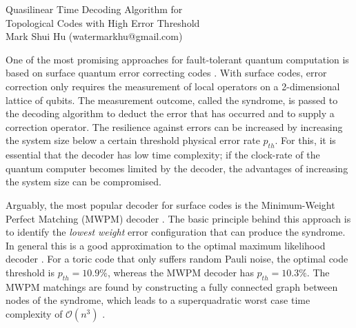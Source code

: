 \documentclass[11pt, a4paper, twoside, titlepage ,dvipsnames]{report}
\begin{document}
\begingroup
    \centering
    \Large Quasilinear Time Decoding Algorithm for \\Topological Codes with High Error Threshold\\[.5em]
    \large Mark Shui Hu (watermarkhu@gmail.com)\par
\endgroup
\vspace{2em}
One of the most promising approaches for fault-tolerant quantum computation is based on surface quantum error correcting codes \cite{dennis2002topological, kitaev2003fault}. With surface codes, error correction only requires the measurement of local operators on a 2-dimensional lattice of qubits. The measurement outcome, called the syndrome, is passed to the decoding algorithm to deduct the error that has occurred and to supply a correction operator. 
The resilience against errors can be increased by increasing the system size below a certain threshold physical error rate $p_{th}$. For this, it is essential that the decoder has low time complexity; if the clock-rate of the quantum computer becomes limited by the decoder, the advantages of increasing the system size can be compromised.

Arguably, the most popular decoder for surface codes is the Minimum-Weight Perfect Matching (MWPM) decoder \cite{dennis2002topological}. The basic principle behind this approach is to identify the \emph{lowest weight} error configuration that can produce the syndrome. In general this is a good approximation to the optimal maximum likelihood decoder \cite{bravyi2014efficient}. For a toric code that only suffers random Pauli noise, the optimal code threshold is $p_{th} = 10.9\%$, whereas the MWPM decoder has $p_{th} = 10.3\%$. The MWPM matchings are found by constructing a fully connected graph between nodes of the syndrome, which leads to a superquadratic worst case time complexity of $\mathcal{O}(n^3)$ \cite{kolmogorov2009blossom}.
\end{document}
